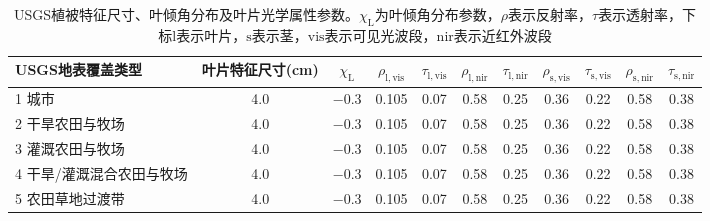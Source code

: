 \begin{landscape}
  \begin{table}[htbp]
    \centering
    \caption[USGS植被特征尺寸、叶倾角分布及叶片光学属性参数]{USGS植被特征尺寸、叶倾角分布及叶片光学属性参数。$\chi_{\mathrm {L}} $为叶倾角分布参数，$\rho$表示反射率，$\tau$表示透射率，下标${\mathrm {l}}$表示叶片，${\mathrm {s}}$表示茎，${\mathrm {vis}}$表示可见光波段，${\mathrm {nir}}$表示近红外波段}
    \label{tab:USGS植被特征尺寸叶倾角分布及叶片光学属性参数1}
    \begin{tabular}{@{}lcccccccccc@{}}
      \toprule
      USGS地表覆盖类型          & 叶片特征尺寸(cm) & $\chi_{\mathrm {L}} $ & $\rho_{\mathrm{l, vis}}$ & $\tau_{\mathrm{l, vis}}$ & $\rho_{\mathrm{l, nir}}$ & $\tau_{\mathrm{l, nir}}$ & $\rho_{\mathrm{s, vis}}$ & $\tau_{\mathrm{s, vis}}$ & $\rho_{\mathrm{s, nir}}$ & $\tau_{\mathrm{s,nir}}$ \\ \midrule
      1 城市                    & 4.0              & \num{ -0.3  }         & 0.105                    & 0.07                     & 0.58                     & 0.25                     & 0.36                     & 0.22                     & 0.58                     & 0.38                    \\
      2 干旱农田与牧场          & 4.0              & \num{ -0.3  }         & 0.105                    & 0.07                     & 0.58                     & 0.25                     & 0.36                     & 0.22                     & 0.58                     & 0.38                    \\
      3 灌溉农田与牧场          & 4.0              & \num{ -0.3  }         & 0.105                    & 0.07                     & 0.58                     & 0.25                     & 0.36                     & 0.22                     & 0.58                     & 0.38                    \\
      4 干旱/灌溉混合农田与牧场 & 4.0              & \num{ -0.3  }         & 0.105                    & 0.07                     & 0.58                     & 0.25                     & 0.36                     & 0.22                     & 0.58                     & 0.38                    \\
      5 农田草地过渡带          & 4.0              & \num{ -0.3  }         & 0.105                    & 0.07                     & 0.58                     & 0.25                     & 0.36                     & 0.22                     & 0.58                     & 0.38                    \\

\end{tabular}
\end{table}
\end{landscape}

